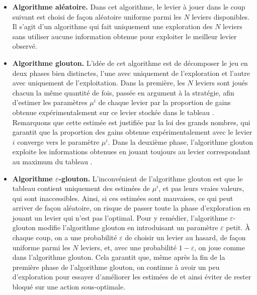 \documentclass[a4paper,11pt]{article}
\begin{document}
\begin{itemize}[label=\textbullet, leftmargin=*]
\item \textbf{Algorithme aléatoire.} Dans cet algorithme, le levier à jouer dans le coup suivant est choisi de façon aléatoire uniforme parmi les $N$ leviers disponibles. Il s'agit d'un algorithme qui fait uniquement une exploration des $N$ leviers sans utiliser aucune information obtenue pour exploiter le meilleur levier observé.

\item \textbf{Algorithme glouton.} L'idée de cet algorithme est de décomposer le jeu en deux phases bien distinctes, l'une avec uniquement de l'exploration et l'autre avec uniquement de l'exploitation. Dans la première, les $N$ leviers sont joués chacun la même quantité de fois, passée en argument à la stratégie, afin d'estimer les paramètres $\mu^i$ de chaque levier par la proportion de gains obtenue expérimentalement sur ce levier stockée dans le tableau \verb@mu@. Remarquons que cette estimée est justifiée par la loi des grands nombres, qui garantit que la proportion des gains obtenue expérimentalement avec le levier $i$ converge vers le paramètre $\mu^i$. Dans la deuxième phase, l'algorithme glouton exploite les informations obtenues en jouant toujours au levier correspondant au maximum du tableau \verb@mu@.

\item \textbf{Algorithme $\varepsilon$-glouton.} L'inconvénient de l'algorithme glouton est que le tableau \verb@mu@ contient uniquement des estimées de $\mu^i$, et pas leurs vraies valeurs, qui sont inaccessibles. Ainsi, si ces estimées sont mauvaises, ce qui peut arriver de façon aléatoire, on risque de passer toute la phase d'exploration en jouant un levier qui n'est pas l'optimal. Pour y remédier, l'algorithme $\varepsilon$-glouton modifie l'algorithme glouton en introduisant un paramètre $\varepsilon$ petit. À chaque coup, on a une probabilité $\varepsilon$ de choisir un levier au hasard, de façon uniforme parmi les $N$ leviers, et, avec une probabilité $1 - \varepsilon$, on joue comme dans l'algorithme glouton. Cela garantit que, même après la fin de la première phase de l'algorithme glouton, on continue à avoir un peu d'exploration pour essayer d'améliorer les estimées de \verb@mu@ et ainsi éviter de rester bloqué sur une action sous-optimale.


\end{itemize}
\end{document}
